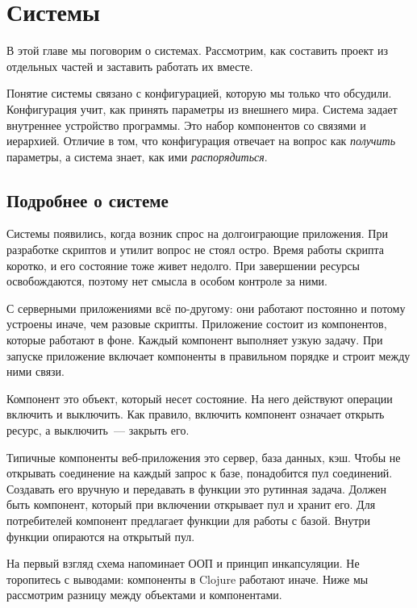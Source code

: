 \chapter{Системы}

\label{chapter-systems}

\begin{teaser}
В этой главе мы поговорим о системах. Рассмотрим, как составить проект из
отдельных частей и заставить работать их вместе.
\end{teaser}

Понятие системы связано с конфигурацией, которую мы только что
обсудили. Конфигурация учит, как принять параметры из внешнего мира. Система
задает внутреннее устройство программы. Это набор компонентов со связями и
иерархией. Отличие в том, что конфигурация отвечает на вопрос как
\emph{получить} параметры, а система знает, как ими \emph{распорядиться}.

\section{Подробнее о системе}

Системы появились, когда возник спрос на долгоиграющие приложения. При
разработке скриптов и утилит вопрос не стоял остро. Время работы скрипта
коротко, и его состояние тоже живет недолго. При завершении ресурсы
освобождаются, поэтому нет смысла в особом контроле за ними.

С серверными приложениями вс\"{е} по-другому: они работают постоянно и потому
устроены иначе, чем разовые скрипты. Приложение состоит из компонентов, которые
работают в фоне. Каждый компонент выполняет узкую задачу. При запуске приложение
включает компоненты в правильном порядке и строит между ними связи.

Компонент это объект, который несет состояние. На него действуют операции
включить и выключить. Как правило, включить компонент означает открыть ресурс, а
выключить~--- закрыть его.

Типичные компоненты веб-приложения это сервер, база данных, кэш. Чтобы не
открывать соединение на каждый запрос к базе, понадобится пул
соединений. Создавать его вручную и передавать в функции это рутинная
задача. Должен быть компонент, который при включении открывает пул и хранит
его. Для потребителей компонент предлагает функции для работы с базой. Внутри
функции опираются на открытый пул.

На первый взгляд схема напоминает ООП и принцип инкапсуляции. Не торопитесь с
выводами: компоненты в Clojure работают иначе. Ниже мы рассмотрим разницу между
объектами и компонентами.

